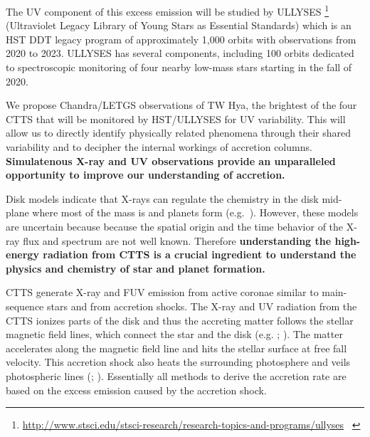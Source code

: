 \documentclass[letterpaper,11pt,twocolumn]{article}
\begin{document}
The UV component of this excess emission will be studied by ULLYSES \footnote{\url{http://www.stsci.edu/stsci-research/research-topics-and-programs/ullyses} ~}
(Ultraviolet Legacy Library of Young Stars as Essential Standards) which is an HST DDT legacy program of  approximately 1,000 orbits with observations from 2020 to 2023. ULLYSES has several components, including 100 orbits dedicated to spectroscopic monitoring of four nearby low-mass stars  starting in the fall of 2020.

We propose Chandra/LETGS observations of TW Hya, the brightest of the four  CTTS that will be monitored by HST/ULLYSES for UV variability.
This will allow us to directly identify physically related phenomena through
their shared variability and to decipher the internal workings of accretion columns.  {\bf Simulatenous X-ray and UV
observations provide an unparalleled opportunity to improve
our understanding of accretion.}


Disk models indicate that X-rays can regulate the chemistry in the disk mid-plane where most of the mass is and planets form (e.g.\ ). However, these models are uncertain because because the spatial origin and the time behavior of the X-ray flux and spectrum are not well known.
Therefore
{\bf understanding the high-energy radiation from CTTS is a crucial ingredient to understand the physics and chemistry of star and planet formation.} 

CTTS generate X-ray and FUV emission from active coronae similar to main-sequence stars and from accretion shocks.
The X-ray and UV radiation from the CTTS ionizes parts of the disk and thus the accreting matter follows the stellar magnetic field lines, which connect the star and the disk (e.g. ; ). The matter accelerates along the magnetic field line and hits the stellar surface at free fall velocity.
This accretion shock also heats the surrounding photosphere and veils photospheric lines (; ). Essentially all methods to derive 
the accretion rate are based on the excess emission caused by the accretion shock. 
\end{document}
